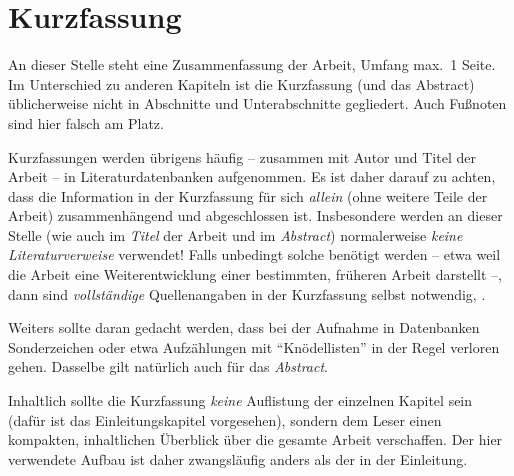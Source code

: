 \chapter{Kurzfassung}

An dieser Stelle steht eine Zusammenfassung der Arbeit, Umfang
max.\ 1 Seite. Im Unterschied zu anderen Kapiteln ist die
Kurzfassung (und das Abstract) üblicherweise nicht in Abschnitte
und Unterabschnitte gegliedert. 
Auch Fußnoten sind hier falsch am Platz.

Kurzfassungen werden übrigens häufig -- zusammen mit Autor und Titel
der Arbeit -- %
in Literaturdatenbanken aufgenommen. Es ist daher darauf zu
achten, dass die Information in der Kurzfassung für sich 
\emph{allein} (\dah ohne weitere Teile der Arbeit) zusammenhängend und
abgeschlossen ist. Insbesondere werden an dieser Stelle (wie \ua
auch im \emph{Titel} der Arbeit und im \emph{Abstract})
normalerweise \emph{keine Literaturverweise} verwendet! Falls
unbedingt solche benötigt werden -- etwa weil die Arbeit eine
Weiterentwicklung einer bestimmten, früheren Arbeit darstellt --,
dann sind \emph{vollständige} Quellenangaben in der Kurzfassung
selbst notwendig, .

Weiters sollte daran gedacht werden, dass bei der Aufnahme in Datenbanken
Sonderzeichen oder etwa Aufzählungen mit "`Knödellisten"' in der
Regel verloren gehen. Dasselbe gilt natürlich auch für das 
\emph{Abstract}.


Inhaltlich sollte die Kurzfassung \emph{keine} Auflistung der
einzelnen Kapitel sein (dafür ist das Einleitungskapitel
vorgesehen), sondern dem Leser einen kompakten, inhaltlichen
Überblick über die gesamte Arbeit verschaffen. Der hier verwendete
Aufbau ist daher zwangsläufig anders als der in der Einleitung.
